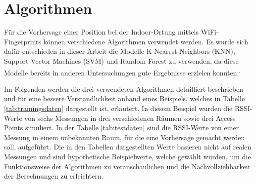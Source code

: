 \chapter{Algorithmen} \label{algorithmen}




Für die Vorhersage einer Position bei der Indoor-Ortung mittels WiFi-Fingerprints können verschiedene Algorithmen verwendet werden. Es wurde sich dafür entschieden in dieser Arbeit die Modelle K-Nearest Neighbors (KNN), Support Vector Machines (SVM) und Random Forest zu verwenden, da diese Modelle bereits in anderen Untersuchungen gute Ergebnisse erzielen konnten.\textsuperscript{,}

Im Folgenden werden die drei verwendeten Algorithmen detailliert beschrieben und für eine bessere Verständlichkeit anhand eines Beispiels, welches in Tabelle \ref{tab:trainingsdaten} dargestellt ist, erläutert. In diesem Beispiel wurden die RSSI-Werte von sechs Messungen in drei verschiedenen Räumen sowie drei Access Points simuliert. In der Tabelle \ref{tab:testdaten} sind die RSSI-Werte von einer Messung in einem unbekannten Raum, für die eine Vorhersage gemacht werden soll, aufgeführt. Die in den Tabellen dargestellten Werte basieren nicht auf realen Messungen und sind hypothetische Beispielwerte, welche gewählt wurden, um die Funktionsweise der Algorithmen zu veranschaulichen und die Nachvollziehbarkeit der Berechnungen zu erleichtern.

